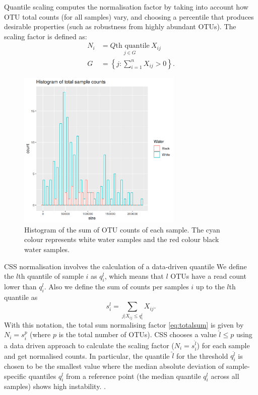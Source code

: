 Quantile scaling computes the normalisation factor by taking into account how OTU total counts (for all samples) vary, and choosing a percentile that produces desirable properties (such as robustness from highly abundant OTUs).
The scaling factor is defined as:
\begin{align}
	N_i &= \underset{ j \in G}{ Q\text{th quantile}} \  X_{ij}\\
	G  &= \left\{ j : \sum_{i = 1}^{n} X_{ij} > 0\right\}.
\end{align}

 
\begin{figure}[htb]
\centering
\includegraphics[width = 0.7\textwidth]{histogramofcountdata}
\caption{Histogram of the sum of OTU counts of each sample. The cyan colour represents white water samples and the red colour black water samples.}
\label{fig:counthistogram}
\end{figure}

CSS normalisation involves the calculation of a data-driven quantile 
We define the $l$th quantile of sample $i$ as $q_i^l$, which means that $l$ OTUs have a read count lower than $q_i^l$. Also we define the sum of counts per samples $i$ up to the $l$th quantile as
\begin{equation}
	s_{i}^{l}=\sum_{j|X_{ij} \leq q_{i}^{l}} X_{ij}.
\end{equation} 
With this notation, the total sum normalising factor \eqref{eq:totalsum} is given by $N_i = s_i^p$ (where $p$ is the total number of OTUs). CSS chooses a value $\hat{l} \leq p$ using a data driven approach to calculate the scaling factor ($N_i = s_i^{\hat{l}}$) for each sample and get normalised counts.
In particular, the quantile $\hat{l}$ for the threshold $q_i^{\hat{l}}$ is chosen  to be the smallest value where the median absolute deviation of sample-specific quantiles $q_i^l$ from a reference point (the median quantile $q_i^l$ across all samples) shows high instability. \cite{css_diff_abund}.

